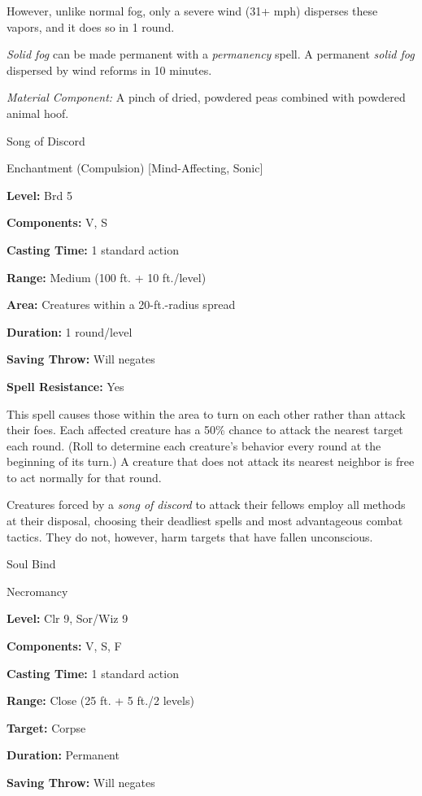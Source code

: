 \documentclass{article}
\begin{document}
However, unlike normal fog, only a severe wind (31+ mph) disperses these vapors, 
and it does so in 1 round.

\textit{Solid fog }can be made permanent with a \textit{permanency }spell. A permanent 
\textit{solid fog }dispersed by wind reforms in 10 minutes.

\textit{Material Component: }A pinch of dried, powdered peas combined with powdered 
animal hoof.

\vspace{12pt}
Song of Discord

Enchantment (Compulsion) [Mind-Affecting, Sonic]

\textbf{Level:} Brd 5

\textbf{Components:} V, S

\textbf{Casting Time:} 1 standard action

\textbf{Range: }Medium (100 ft. + 10 ft./level)

\textbf{Area:} Creatures within a 20-ft.-radius spread

\textbf{Duration:} 1 round/level

\textbf{Saving Throw: }Will negates

\textbf{Spell Resistance:} Yes

This spell causes those within the area to turn on each other rather than attack 
their foes. Each affected creature has a 50\% chance to attack the nearest target 
each round. (Roll to determine each creature's behavior every round at the beginning 
of its turn.) A creature that does not attack its nearest neighbor is free to act 
normally for that round.

Creatures forced by a \textit{song of discord }to attack their fellows employ all 
methods at their disposal, choosing their deadliest spells and most advantageous 
combat tactics. They do not, however, harm targets that have fallen unconscious.

\vspace{12pt}
Soul Bind

Necromancy

\textbf{Level:} Clr 9, Sor/Wiz 9

\textbf{Components:} V, S, F

\textbf{Casting Time:} 1 standard action

\textbf{Range:} Close (25 ft. + 5 ft./2 levels)

\textbf{Target:} Corpse

\textbf{Duration:} Permanent

\textbf{Saving Throw: }Will negates
\end{document}
